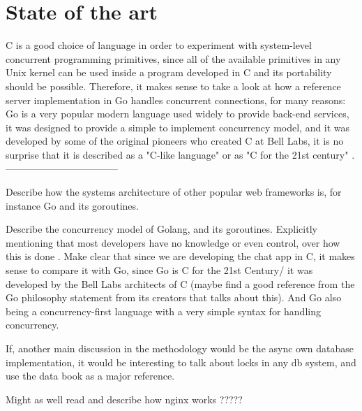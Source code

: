 \section{State of the art}
C is a good choice of language in order to experiment with system-level concurrent programming primitives, since all of the available primitives in any Unix kernel can be used inside a program developed in C and its portability should be possible. Therefore, it makes sense to take a look at how a reference server implementation in Go handles concurrent connections, for many reasons: Go is a very popular modern language used widely to provide back-end services, it was designed to provide a simple to implement concurrency model, and it was developed by some of the original pioneers who created C at Bell Labs, it is no surprise that it is described as a "C-like language" or as "C for the 21st century" \cite{GoPL2015}.
-----------------------------------

Describe how the systems architecture of other popular web frameworks is, for instance Go and its goroutines.

Describe the concurrency model of Golang, and its goroutines. Explicitly mentioning that most developers have no knowledge or even control, over how this is done \cite{Cox-Buday2017}. Make clear that since we are developing the chat app in C, it makes sense to compare it with Go, since Go is C for the 21st Century/ it was developed by the Bell Labs architects of C (maybe find a good reference from the Go philosophy statement from its creators that talks about this). And Go also being a concurrency-first language with a very simple syntax for handling concurrency.

If, another main discussion in the methodology would be the async own database implementation, it would be interesting to talk about locks in any db system, and use the data book as a major reference.

Might as well read and describe how nginx works ?????
